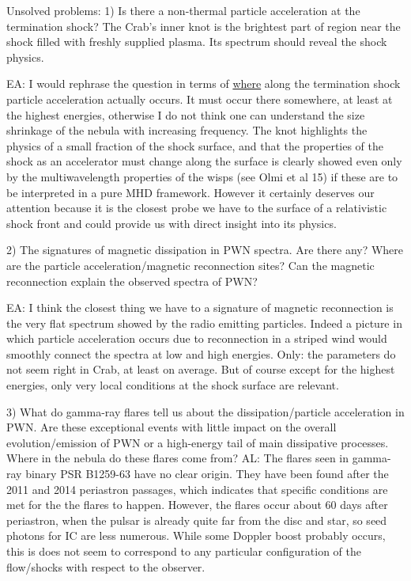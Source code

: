 Unsolved problems:
1) Is there a non-thermal particle acceleration at the termination shock? The Crab's inner knot is the brightest part of region near the shock filled with freshly supplied plasma. Its spectrum should reveal the shock physics. 

EA: I would rephrase the question in terms of \underline{where} along the termination shock particle acceleration actually occurs. It must occur there somewhere, at least at the highest energies, otherwise I do not think one can understand the size shrinkage of the nebula with increasing frequency. 
The knot highlights the physics of a small fraction of the shock surface, and that the properties of the shock as an accelerator must change along the surface is clearly showed even only by the multiwavelength properties of the wisps (see Olmi et al 15) if these are to be interpreted in a pure MHD framework. However it certainly deserves our attention because it is the closest probe we have to the surface of a relativistic shock front and could provide us with direct insight into its physics. 


2) The signatures of magnetic dissipation in PWN spectra. Are there any?  Where are the particle acceleration/magnetic reconnection sites? Can the magnetic reconnection explain the observed spectra of PWN? 

EA: I think the closest thing we have to a signature of magnetic reconnection is the very flat spectrum showed by the radio emitting particles. Indeed a picture in which particle acceleration occurs due to reconnection in a striped wind would smoothly connect the spectra at low and high energies. Only: the parameters do not seem right in Crab, at least on average. But of course except for the highest energies, only very local conditions at the shock surface are relevant.

3) What do gamma-ray flares tell us about the dissipation/particle acceleration in PWN. 
Are these exceptional events with little impact on the overall evolution/emission of PWN or a high-energy tail of main dissipative processes. Where in the nebula do these flares come from? 
AL: The flares seen in gamma-ray binary PSR B1259-63 have no clear origin.  They have been found after the  2011 and 2014 periastron passages, which indicates that specific conditions are met for the the flares to happen. However, the flares occur about 60 days after periastron, when the pulsar is already quite far from the disc and star, so seed photons for IC are less numerous. While some Doppler boost probably occurs, this is does not seem to correspond to any particular configuration of the flow/shocks with respect to the observer.



